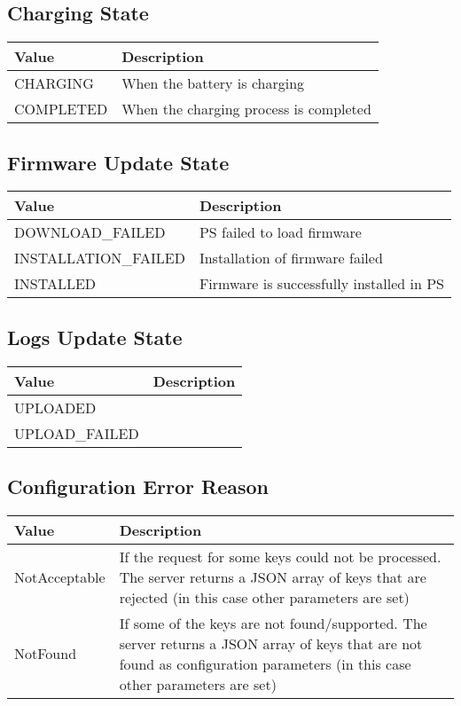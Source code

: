 \subsection{Charging State}
\label{types:ChargingState}

\begin{tabularx}{\linewidth}{ | l | X | }
  \hline
  \rowcolor{table-head}
  Value & Description \\
  \hline
  CHARGING 		& When the battery is charging\\
  COMPLETED 	& When the charging process is completed \\
  \hline
\end{tabularx}

\subsection{Firmware Update State}
\label{types:FirmwareState}

\begin{tabularx}{\linewidth}{ | l | X | }
  \hline
  \rowcolor{table-head}
  Value & Description \\
  \hline
  DOWNLOAD\_FAILED & \acs{PS} failed to load firmware \\
  INSTALLATION\_FAILED & Installation of firmware failed \\
  INSTALLED & Firmware is successfully installed in \acs{PS} \\
  \hline
\end{tabularx}

\subsection{Logs Update State}
\label{types:LogUpdateState}

\begin{tabularx}{\linewidth}{ | l | X | }
  \hline
  \rowcolor{table-head}
  Value & Description \\
  \hline
  UPLOADED 		&  \\
  UPLOAD\_FAILED 	&  \\
  \hline
\end{tabularx}

\subsection{Configuration Error Reason}
\label{types:ConfigErrorReason}

\begin{tabularx}{\linewidth}{ | l | X | }
  \hline
  \rowcolor{table-head}
  Value & Description \\
  \hline
  NotAcceptable 		& If the request for some keys could not be processed. The server returns a JSON array of keys that are rejected (in this case other parameters are set) \\
  NotFound 	& If some of the keys are not found/supported. The server returns a JSON array of keys that are not found as configuration parameters (in this case other parameters are set) \\
  \hline
\end{tabularx}

